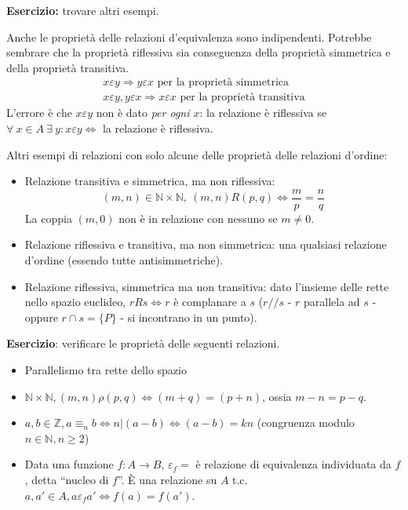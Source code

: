 \textbf{Esercizio:} trovare altri esempi.

\vspace{5cm}

Anche le propriet\`a delle relazioni d'equivalenza sono indipendenti. Potrebbe sembrare che la propriet\`a riflessiva sia conseguenza della propriet\`a simmetrica e della propriet\`a transitiva.
\begin{gather*}
x \varepsilon y \Rightarrow y \varepsilon x \text{ per la propriet\`a simmetrica} \\
x \varepsilon y , y \varepsilon x \Rightarrow x \varepsilon x \text{ per la propriet\`a transitiva}
\end{gather*}
L'errore \`e che $x \varepsilon y$ non \`e dato \textit{per ogni $x$}: la relazione \`e riflessiva se $\forall \ x \in A \ \exists \ y : x \varepsilon y \Leftrightarrow $ la relazione \`e riflessiva.

Altri esempi di relazioni con solo alcune delle propriet\`a delle relazioni d'ordine:
\begin{itemize}
  \item Relazione transitiva e simmetrica, ma non riflessiva:
  \[
  (m, n) \in \mathbb{N} \times \mathbb{N}, \ (m,n) R (p, q) \Leftrightarrow \frac{m}{p} = \frac{n}{q}
  \]
  La coppia $(m,0)$ non \`e in relazione con nessuno se $m \neq 0$.
  \item Relazione riflessiva e transitiva, ma non simmetrica: una qualsiasi relazione d'ordine (essendo tutte antisimmetriche).
  \item Relazione riflessiva, simmetrica ma non transitiva: dato l'insieme delle rette nello spazio euclideo, $r R s \Leftrightarrow r $ \`e complanare a $s$ ($r // s$ - $r$ parallela ad $s$ - oppure $r \cap s = \{ P \}$ - si incontrano in un punto).
\end{itemize}

\textbf{Esercizio}: verificare le propriet\`a delle seguenti relazioni.
\begin{itemize}
  \item Parallelismo tra rette dello spazio \vspace{3cm}
  \item $\mathbb{N} \times \mathbb{N}, (m, n) \rho (p, q) \Leftrightarrow (m + q) = (p + n)$, ossia $m - n = p - q$. \vspace{3cm}
  \item $a, b \in \mathbb{Z}, a \equiv_n b \Leftrightarrow n | (a - b) \Leftrightarrow (a-b) = k n$ (congruenza modulo $n \in \mathbb{N}, n \ge 2$) \vspace{3cm}
  \item Data una funzione $f: A \to B $, $ \varepsilon_f = $ \`e relazione di equivalenza individuata da $f$, detta ``nucleo di $f$''. \`E una relazione su $A$ t.c. $a, a' \in A, a \varepsilon_f a' \Leftrightarrow f(a) = f(a')$. \vspace{3cm}
\end{itemize}

